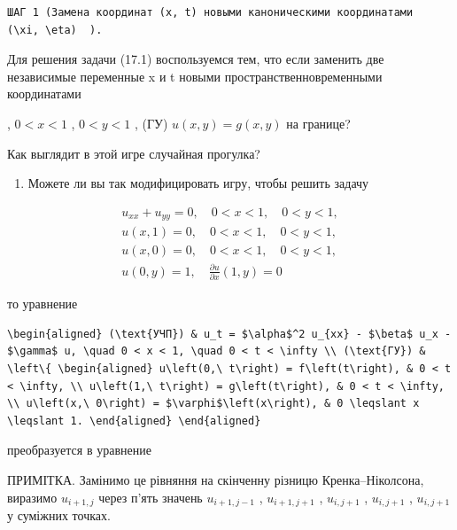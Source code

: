 \documentclass[
  ukrainian,
]{article}
\providecommand{\tightlist}{%
  \setlength{\itemsep}{0pt}\setlength{\parskip}{0pt}}
\begin{document}
\begin{verbatim}
ШАГ 1 (Замена координат (x, t) новыми каноническими координатами   (\xi, \eta)  ).
\end{verbatim}

Для решения задачи (17.1) воспользуемся тем, что если заменить две
независимые переменные x и t новыми пространственновременными
координатами

, \(0 < x < 1\) , \(0 < y < 1\) , (ГУ) \(u(x, y) = g(x, y)\) на границе?

Как выглядит в этой игре случайная прогулка?

\begin{enumerate}
\def\labelenumi{\arabic{enumi}.}
\setcounter{enumi}{3}
\tightlist
\item
  Можете ли вы так модифицировать игру, чтобы решить задачу
\end{enumerate}

\[
\begin{aligned} u_{xx} + u_{yy} = 0, \quad 0 < x < 1, \quad 0 < y < 1, \\ u(x, 1) = 0, \quad 0 < x < 1, \quad 0 < y < 1, \\ u(x, 0) = 0, \quad 0 < x < 1, \quad 0 < y < 1, \\ u(0, y) = 1, \quad \frac{\partial u}{\partial x}(1, y) = 0 \end{aligned}
\]

то уравнение

\begin{verbatim}
\begin{aligned} (\text{УЧП}) & u_t = $\alpha$^2 u_{xx} - $\beta$ u_x - $\gamma$ u, \quad 0 < x < 1, \quad 0 < t < \infty \\ (\text{ГУ}) & \left\{ \begin{aligned} u\left(0,\ t\right) = f\left(t\right), & 0 < t < \infty, \\ u\left(1,\ t\right) = g\left(t\right), & 0 < t < \infty, \\ u\left(x,\ 0\right) = $\varphi$\left(x\right), & 0 \leqslant x \leqslant 1. \end{aligned} \end{aligned}
\end{verbatim}

преобразуется в уравнение

ПРИМІТКА. Замінимо це рівняння на скінченну різницю Кренка--Ніколсона,
виразимо \(u_{i+1,j}\) через п'ять значень \(u_{i+1,j-1}\) ,
\(u_{i+1,j+1}\) , \(u_{i,j+1}\) , \(u_{i,j+1}\) , \(u_{i,j+1}\) у
суміжних точках.
\end{document}

